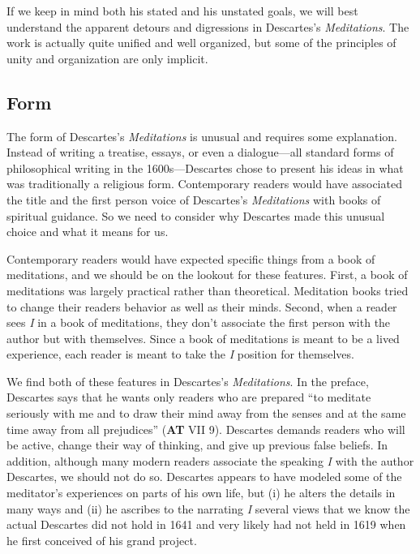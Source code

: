 If we keep in mind both his stated and his unstated goals, we will best understand the apparent detours and digressions in Descartes's \textit{Meditations}. The work is actually quite unified and well organized, but some of the principles of unity and organization are only implicit.

\subsection*{Form}

The form of Descartes's \textit{Meditations} is unusual and requires some explanation. Instead of writing a treatise, essays, or even a dialogue---all standard forms of philosophical writing in the 1600s---Descartes chose to present his ideas in what was traditionally a religious form. Contemporary readers would have associated the title and the first person voice of Descartes's \textit{Meditations} with books of spiritual guidance. So we need to consider why Descartes made this unusual choice and what it means for us.

Contemporary readers would have expected specific things from a book of meditations, and we should be on the lookout for these features. First, a book of meditations was largely practical rather than theoretical. Meditation books tried to change their readers behavior as well as their minds. Second, when a reader sees \textit{I} in a book of meditations, they don't associate the first person with the author but with themselves. Since a book of meditations is meant to be a lived experience, each reader is meant to take the \textit{I} position for themselves.

We find both of these features in Descartes's \textit{Meditations}. In the preface, Descartes says that he wants only readers who are prepared ``to meditate seriously with me and to draw their mind away from the senses and at the same time away from all prejudices'' (\textbf{AT} VII 9). Descartes demands readers who will be active, change their way of thinking, and give up previous false beliefs. In addition, although many modern readers associate the speaking \textit{I} with the author Descartes, we should not do so. Descartes appears to have modeled some of the meditator's experiences on parts of his own life, but (i) he alters the details in many ways and (ii) he ascribes to the narrating \textit{I} several views that we know the actual Descartes did not hold in 1641 and very likely had not held in 1619 when he first conceived of his grand project.

